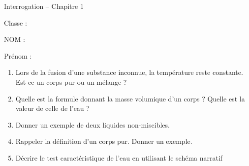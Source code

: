 
\cfoot{} %
\usepackage{setspace}



\begin{header}
Interrogation -- Chapitre 1

\normalsize
\flushleft
\begin{doublespace}
Classe :

NOM :

\end{doublespace}
Prénom :
\end{header}

\begin{enumerate}
\item Lors de la fusion d'une substance inconnue, la température reste constante.
Est-ce un corps pur ou un mélange ?
\vfill
\item Quelle est la formule donnant la masse volumique d'un corps ? Quelle est la valeur de celle de l'eau ?
\vfill
\item Donner un exemple de deux liquides non-miscibles.
\vfill
\item Rappeler la définition d'un corps pur. Donner un exemple.
\vfill
\item Décrire le test caractéristique de l'eau en utilisant le schéma narratif
\vfill
\end{enumerate}


